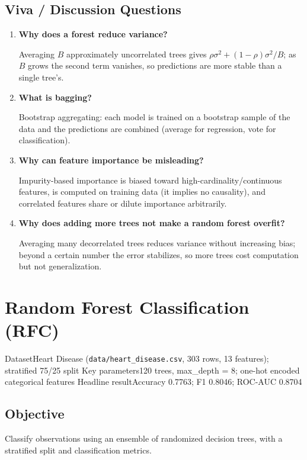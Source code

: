\section{Viva / Discussion Questions}
\begin{enumerate}
  \item \textbf{Why does a forest reduce variance?}\par\nobreak Averaging $B$ approximately uncorrelated trees
  gives $\rho\sigma^2 + (1-\rho)\sigma^2/B$; as $B$ grows the second term vanishes, so
  predictions are more stable than a single tree's.
  \item \textbf{What is bagging?}\par\nobreak Bootstrap aggregating: each model is trained on a bootstrap sample
  of the data and the predictions are combined (average for regression, vote for
  classification).
  \item \textbf{Why can feature importance be misleading?}\par\nobreak Impurity-based importance is biased toward
  high-cardinality/continuous features, is computed on training data (it implies no causality),
  and correlated features share or dilute importance arbitrarily.
\item \textbf{Why does adding more trees not make a random forest overfit?}\par\nobreak Averaging many decorrelated trees reduces variance without increasing bias; beyond a certain number the error stabilizes, so more trees cost computation but not generalization.
\end{enumerate}


\chapter{Random Forest Classification (RFC)}\label{exp:09}


\quickfacts
  {Dataset}{Heart Disease (\texttt{data/heart\_disease.csv}, 303 rows, 13 features); stratified 75/25 split}
  {Key parameters}{120 trees, max\_depth = 8; one-hot encoded categorical features}
  {Headline result}{Accuracy 0.7763; F1 0.8046; ROC-AUC 0.8704}

\section{Objective}
Classify observations using an ensemble of randomized decision trees, with a stratified
split and classification metrics.

